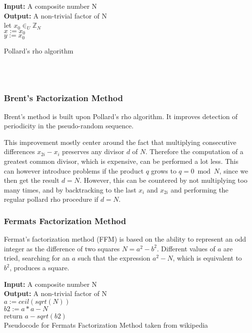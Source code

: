 \documentclass[paper=a4, fontsize=11pt,numbers=endperiod]{scrartcl} %
\providecommand{\abs}[1]{\lvert#1\rvert} %
\numberwithin{equation}{section} %
\numberwithin{figure}{section} %
\numberwithin{table}{section} %
\begin{document}
\begin{algorithm}[H]
 \SetAlgoLined %
 \textbf{Input:} {A composite number N}\\
 \textbf{Output:} {A non-trivial factor of N}\\
 let $x_0 \in_U \mathbb{Z}_N$\\
 $x := x_0$\\
 $y := x_0$\\
 \While{True}{
  $x := f(x)$\;
  $y := f(f(y))$\;
  $d := gcd( \abs{y-x}, N)$\;
  \If{$d > 1$}{
   return d\;
   }
 }
 \caption{Pollard's rho algorithm}
\end{algorithm}
\hspace{0pt}\\\\


\subsubsection{Brent's Factorization Method}
Brent's method is built upon Pollard's rho algorithm. It improves detection of periodicity in the pseudo-random sequence. \cite{brent}

This improvement mostly center around the fact that multiplying consecutive differences $x_{2i}-x_i$ preserves any divisor $d$ of $N$.
Therefore the computation of a greatest common divisor, which is expensive, can be performed a lot less.
This can however introduce problems if the product $q$ grows to $q = 0 \bmod N$, since we then get the result $d=N$.
However, this can be countered by not multiplying too many times, and by backtracking to the last $x_i$ and $x_{2i}$ and performing the regular pollard rho procedure if $d=N$.


\subsubsection{Fermats Factorization Method}
Fermat's factorization method (FFM) \cite{fermat} is based on the ability to represent an odd integer as the difference of two squares $N = a^2 - b^2$.
Different values of $a$ are tried, searching for an $a$ such that the expression $a^2 - N$, which is equivalent to $b^2$, produces a square.

\begin{algorithm}[H]
 \SetAlgoLined %
 \textbf{Input:} {A composite number N}\\
 \textbf{Output:} {A non-trivial factor of N}\\
 $a := ceil(sqrt(N))$\\
 $b2 := a*a - N$\\
  return $a-sqrt(b2)$\;
  \hspace{0pt}\\
  \caption{Pseudocode for Fermats Factorization Method taken from wikipedia}
\end{algorithm}
\end{document}

